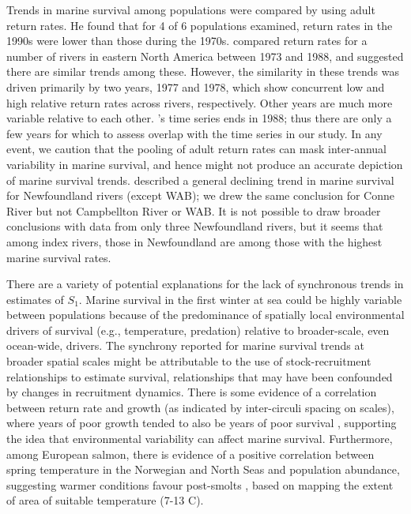 \documentclass[12pt]{article}
\newcommand{\So}{$S_{1}$\xspace}
\begin{document}
Trends in marine survival
among populations were compared by \citet{Chaput2012a} using adult return rates.
He found that for 4 of 6 populations examined, return rates in the 1990s 
were lower than those during the 1970s.
\citet{Friedland1993} compared return rates for a number of rivers in eastern
North America between 1973 and 1988, and suggested there are similar trends among these. 
However, the similarity in these trends was driven primarily by two years, 1977 and 1978, which
show concurrent low and high relative return rates across rivers,
respectively. Other years are much more variable relative to each other.
\citeauthor{Friedland1993}'s \citeyear{Friedland1993} time series ends in  
1988; thus there are only a few years for which to assess overlap with the
time series in our study.
In any event, we caution that the pooling of adult return rates \citep{Chaput2012a, Friedland1993} 
can mask inter-annual variability in marine survival,
and hence might not produce an accurate depiction of marine survival trends.
\citet{Dempson2003} described a general declining trend in marine survival for
Newfoundland rivers (except WAB); we drew the same conclusion for 
Conne River but not Campbellton River or WAB. It is not possible to draw broader conclusions
with data from only three Newfoundland rivers, but it seems that among index rivers,
those in Newfoundland are among those with the highest marine survival rates.

There are a variety of potential explanations for the lack of synchronous
trends in estimates of \So. 
Marine survival in the first winter at sea could be highly variable between
populations because of the predominance of spatially local environmental drivers of survival (e.g., temperature, predation) 
relative to broader-scale, even ocean-wide, drivers.
The synchrony reported for marine survival trends at broader spatial scales \citep{Olmos2019}
might be attributable to the use of stock-recruitment relationships to estimate survival,
relationships that may have been confounded by changes in recruitment dynamics.
There is some evidence of a correlation between return rate and growth (as
indicated by inter-circuli spacing on scales), where years of poor growth
tended to also be years of poor survival \citep{Friedland1993}, supporting the
idea that environmental variability can affect marine survival.
Furthermore, among European salmon, there is evidence of a positive correlation
between spring temperature in the Norwegian and North Seas and population abundance, suggesting warmer
conditions favour post-smolts \citep{Friedland1998}, based on mapping the
extent of area of suitable temperature (7-13 \textdegree C).
\end{document}
